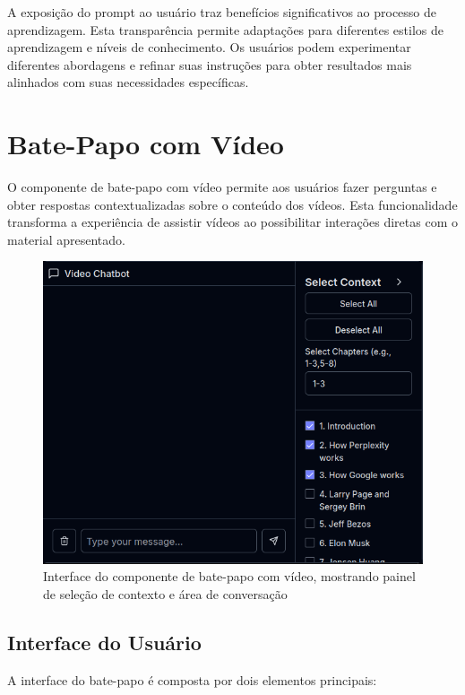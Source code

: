 \documentclass[tcc,capa]{texufpel}
\begin{document}
A exposição do prompt ao usuário traz benefícios significativos ao processo de aprendizagem. Esta transparência permite adaptações para diferentes estilos de aprendizagem e níveis de conhecimento. Os usuários podem experimentar diferentes abordagens e refinar suas instruções para obter resultados mais alinhados com suas necessidades específicas.


\section{Bate-Papo com Vídeo}

O componente de bate-papo com vídeo permite aos usuários fazer perguntas e obter respostas contextualizadas sobre o conteúdo dos vídeos. Esta funcionalidade transforma a experiência de assistir vídeos ao possibilitar interações diretas com o material apresentado.

\begin{figure}[H]
  \centering
  \includegraphics[width=\textwidth,height=0.45\textheight,keepaspectratio]{exemplo-slides/graphics/images/video-chatbot.png}
  \caption{Interface do componente de bate-papo com vídeo, mostrando painel de seleção de contexto e área de conversação}
  \label{fig:video_chatbot}
\end{figure}

\subsection{Interface do Usuário}

A interface do bate-papo é composta por dois elementos principais:
\end{document}
